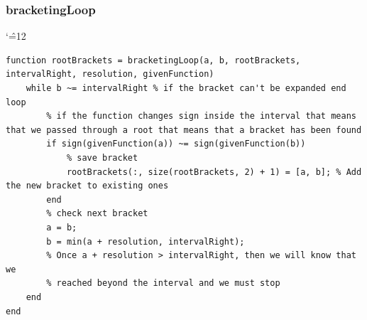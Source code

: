 \documentclass[12pt]{report}
\newenvironment{simplechar}{%
   \catcode`\^=12
}{}
\begin{document}
\newpage
\subsubsection{bracketingLoop}
\begin{simplechar}
\begin{lstlisting}
function rootBrackets = bracketingLoop(a, b, rootBrackets, intervalRight, resolution, givenFunction)
    while b ~= intervalRight % if the bracket can't be expanded end loop
        % if the function changes sign inside the interval that means that we passed through a root that means that a bracket has been found
        if sign(givenFunction(a)) ~= sign(givenFunction(b))
            % save bracket
            rootBrackets(:, size(rootBrackets, 2) + 1) = [a, b]; % Add the new bracket to existing ones
        end
        % check next bracket
        a = b;
        b = min(a + resolution, intervalRight);
        % Once a + resolution > intervalRight, then we will know that we
        % reached beyond the interval and we must stop
    end
end
\end{lstlisting}
\end{simplechar}

\newpage
\end{document}

